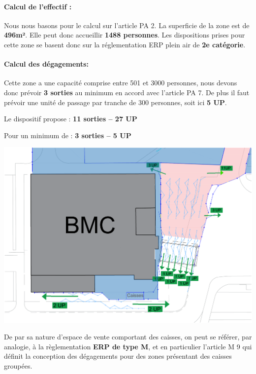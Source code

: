 \documentclass[hidelinks, paper=a4, fontsize=13pt]{report}
\begin{document}
\paragraph{Calcul de l’effectif :}
Nous nous basons pour le calcul sur l’article PA 2. La superficie de la zone est de \textbf{496m²}. Elle peut donc accueillir \textbf{1488 personnes}. Les dispositions prises pour cette zone se basent donc sur la réglementation ERP plein air de \textbf{2e catégorie}. \\
\paragraph{Calcul des dégagements:}
Cette zone a une capacité comprise entre 501 et 3000 personnes, nous devons donc prévoir \textbf{3 sorties} au minimum en accord avec l’article PA 7. De plus il faut prévoir une unité de passage par tranche de 300 personnes, soit ici \textbf{5 UP}. 
\begin{center}
	Le dispositif propose :        \textbf{11 sorties – 27 UP}
	
	Pour un minimum de :         \textbf{ 3 sorties – 5 UP}
\end{center}

\begin{center}
	\includegraphics[width=.8\textwidth,keepaspectratio]{Exports/Plan_24h_44eme-Entree_IS}
\end{center}

De par sa nature d’espace de vente comportant des caisses, on peut se référer, par analogie, à la règlementation \textbf{ERP de type M}, et en particulier l’article M 9 qui définit la conception des dégagements pour des zones présentant des caisses groupées. \\
\end{document}
